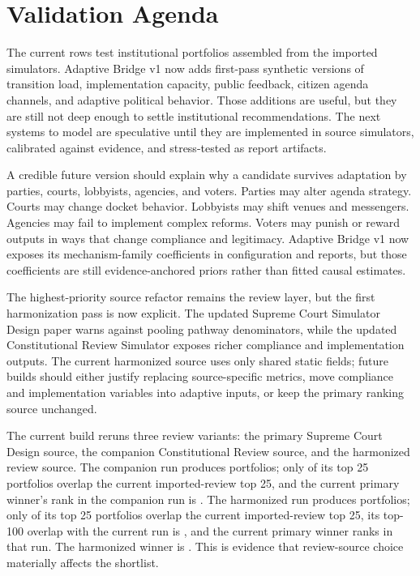 \documentclass[11pt]{article}
\providecommand{\GeneratedDir}{generated}
\begin{document}
\section{Validation Agenda}

The current rows test institutional portfolios assembled from the imported simulators. Adaptive Bridge v1 now adds first-pass synthetic versions of transition load, implementation capacity, public feedback, citizen agenda channels, and adaptive political behavior. Those additions are useful, but they are still not deep enough to settle institutional recommendations. The next systems to model are speculative until they are implemented in source simulators, calibrated against evidence, and stress-tested as report artifacts.



A credible future version should explain why a candidate survives adaptation by parties, courts, lobbyists, agencies, and voters. Parties may alter agenda strategy. Courts may change docket behavior. Lobbyists may shift venues and messengers. Agencies may fail to implement complex reforms. Voters may punish or reward outputs in ways that change compliance and legitimacy. Adaptive Bridge v1 now exposes its mechanism-family coefficients in configuration and reports, but those coefficients are still evidence-anchored priors rather than fitted causal estimates.

The highest-priority source refactor remains the review layer, but the first harmonization pass is now explicit. The updated Supreme Court Simulator Design paper warns against pooling pathway denominators, while the updated Constitutional Review Simulator exposes richer compliance and implementation outputs. The current harmonized source uses only shared static fields; future builds should either justify replacing source-specific metrics, move compliance and implementation variables into adaptive inputs, or keep the primary ranking source unchanged.

The current build reruns three review variants: the primary Supreme Court Design source, the companion Constitutional Review source, and the harmonized review source. The companion run produces \DualReviewCompanionPortfolioCount{} portfolios; only \DualReviewTopTwentyFiveOverlap{} of its top 25 portfolios overlap the current imported-review top 25, and the current primary winner's rank in the companion run is \DualReviewPrimaryWinnerRankInCompanion. The harmonized run produces \HarmonizedReviewPortfolioCount{} portfolios; only \HarmonizedReviewTopTwentyFiveOverlap{} of its top 25 portfolios overlap the current imported-review top 25, its top-100 overlap with the current run is \CurrentHarmonizedTopHundredOverlap, and the current primary winner ranks \HarmonizedReviewPrimaryWinnerRank{} in that run. The harmonized winner is \HarmonizedReviewWinnerName. This is evidence that review-source choice materially affects the shortlist.
\end{document}
